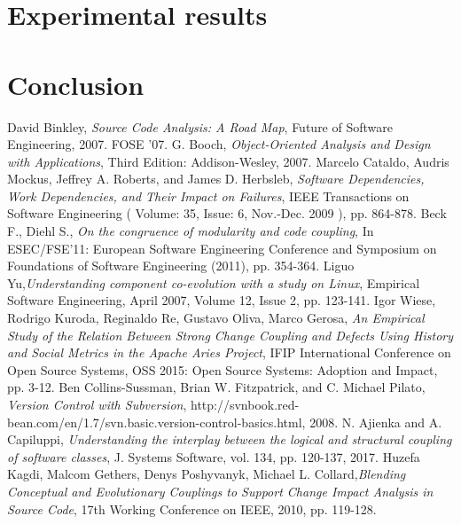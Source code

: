 \documentclass[conference,compsoc]{IEEEtran}
\begin{document}
\section{Experimental results}

\section{Conclusion}


\begin{thebibliography}{1}

David Binkley, \emph{Source Code Analysis: A Road Map}, Future of Software Engineering, 2007. FOSE '07.
G. Booch, \emph{Object-Oriented Analysis and Design with Applications}, Third Edition: Addison-Wesley, 2007.
Marcelo Cataldo, Audris Mockus, Jeffrey A. Roberts, and James D. Herbsleb, \emph{Software Dependencies, Work Dependencies, and Their Impact on Failures},  IEEE Transactions on Software Engineering ( Volume: 35, Issue: 6, Nov.-Dec. 2009 ), pp. 864-878.
Beck F., Diehl S.,\emph{ On the congruence of modularity and code coupling}, In ESEC/FSE'11: European Software Engineering Conference and Symposium on Foundations of Software Engineering (2011), pp. 354-364.
Liguo Yu,\emph{Understanding component co-evolution with a study on Linux}, Empirical Software Engineering, April 2007, Volume 12, Issue 2, pp. 123-141.
Igor Wiese, Rodrigo Kuroda, Reginaldo Re, Gustavo Oliva, Marco Gerosa, \emph{An Empirical Study of the Relation Between Strong Change Coupling and Defects Using History and Social Metrics in the Apache Aries Project}, IFIP International Conference on Open Source Systems, OSS 2015: Open Source Systems: Adoption and Impact, pp. 3-12.
 Ben Collins-Sussman, Brian W. Fitzpatrick, and C. Michael Pilato, \emph{Version Control with Subversion}, http://svnbook.red-bean.com/en/1.7/svn.basic.version-control-basics.html, 2008.
N. Ajienka and A. Capiluppi,  \emph{Understanding the interplay between the logical and structural coupling of software classes}, J. Systems Software, vol. 134, pp. 120-137, 2017.
 Huzefa Kagdi, Malcom Gethers, Denys Poshyvanyk, Michael L. Collard,\emph{Blending Conceptual and Evolutionary Couplings to Support Change Impact Analysis in Source Code}, 17th Working Conference on IEEE, 2010, pp. 119-128.

\end{thebibliography}
\end{document}
